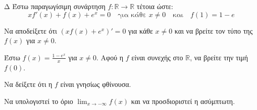 \begin{thema}{Δ}
Έστω παραγωγίσιμη συνάρτηση $f: \mathbb{R} \to \mathbb{R}$ τέτοια ώστε:
\[ x f'(x) + f(x) + e^x = 0 \quad \text{για κάθε } x \ne 0 \quad \text{και} \quad f(1) = 1-e \]
\begin{erwthma}
    \item Να αποδείξετε ότι $(x f(x) + e^x)' = 0$ για κάθε $x \neq 0$ και να βρείτε τον τύπο της $f(x)$ για $x \ne 0$.
    \item Έστω $f(x) = \frac{1 - e^x}{x}$ για $x \ne 0$. Αφού η $f$ είναι συνεχής στο $\mathbb{R}$, να βρείτε την τιμή $f(0)$.
    \item Να δείξετε ότι η $f$ είναι γνησίως φθίνουσα.
    \item Να υπολογιστεί το όριο $\displaystyle \lim_{x \to -\infty} f(x)$  και να προσδιοριστεί η ασύμπτωτη.
\end{erwthma}
\end{thema}

